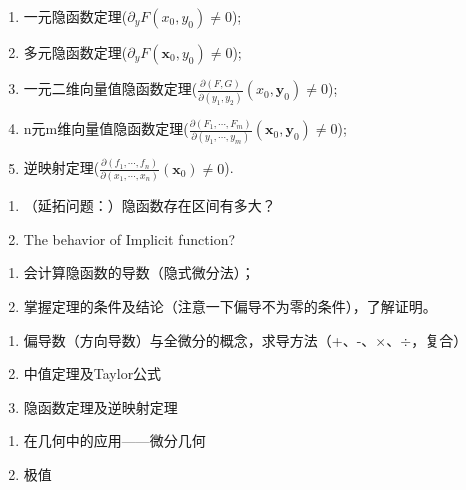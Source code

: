 \documentclass[UTF8]{ctexart}
\newcommand{\p}[2]{\frac{\partial #1}{\partial #2}}
\begin{document}
    \begin{tcolorbox}[colback=red!5!white,arc=1mm,colframe=red!75!black,fonttitle=\bfseries,title=总结]
        \begin{enumerate}
            \item 一元隐函数定理($\partial_yF(x_0,y_0)\not=0$);
            \item 多元隐函数定理($\partial_yF(\boldsymbol{x}_0,y_0)\not=0$);
            \item 一元二维向量值隐函数定理($\p{(F,G)}{(y_1,y_2)}(x_0,\boldsymbol{y}_0)\not=0$);
            \item n元m维向量值隐函数定理($\p{(F_1,\cdots,F_m)}{(y_1,\cdots,y_m)}(\boldsymbol{x}_0,\boldsymbol{y}_0)\not=0$);
            \item 逆映射定理($\p{(f_1,\cdots,f_n)}{(x_1,\cdots,x_n)}(\boldsymbol{x}_0)\not=0$).
        \end{enumerate}
    \end{tcolorbox}

    \begin{tcbitemize}[raster columns=2,raster equal height,equal height group=AT,colframe=red!75!black,colback=red!5!white,fonttitle=\bfseries]
        \tcbitem[title={遗留问题}]
        \begin{enumerate}[a]
            \item （延拓问题：）隐函数存在区间有多大？
            \item The behavior of Implicit function?
        \end{enumerate}
        \tcbitem[title=要求]
        \begin{enumerate}[a]
            \item 会计算隐函数的导数（隐式微分法）；
            \item 掌握定理的条件及结论（注意一下偏导不为零的条件），了解证明。
        \end{enumerate}
    \end{tcbitemize}
    \begin{tcbitemize}[raster columns=2,raster equal height,
        colframe=red!75!black,colback=red!5!white,equal height group=AT,fonttitle=\bfseries]
        \tcbitem[title=理论]
        \begin{enumerate}[1]
            \item 偏导数（方向导数）与全微分的概念，求导方法（+、-、$\times$、$\div$，复合）
            \item 中值定理及Taylor公式
            \item 隐函数定理及逆映射定理
        \end{enumerate}
        \tcbitem[title=应用]
        \begin{enumerate}[1]
            \item 在几何中的应用——微分几何
            \item 极值
        \end{enumerate}
    \end{tcbitemize}
\end{document}
